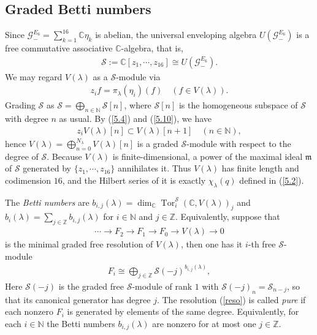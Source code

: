 \documentclass[12pt]{article}
\numberwithin{equation}{section}
\theoremstyle{definition}
\theoremstyle{remark}
\begin{document}
\subsection{Graded Betti numbers}
Since $\mathscr{G}^{E_6}_-=\sum_{k=1}^{16}\mathbb{C}\eta_k$ is abelian, the universal enveloping algebra $U(\mathscr{G}^{E_6}_-)$ is a free commutative associative $\mathbb{C}$-algebra, that is,
\begin{eqnarray}
	\mathscr{S}:=\mathbb{C}[z_1,\cdots,z_{16}]\cong U(\mathscr{G}^{E_6}_-).
\end{eqnarray}
We may regard $V(\lambda)$ as a $\mathscr{S}$-module via
\begin{eqnarray}
	z_if=\pi_{\lambda}(\eta_i)(f)\quad (f\in V(\lambda)).
\end{eqnarray}
Grading $\mathscr{S}$ as $\mathscr{S}=\bigoplus_{n\in\mathbb{N}}\mathscr{S}[n]$, where $\mathscr{S}[n]$ is the homogeneous subspace of $\mathscr{S}$ with degree $n$ as usual.
By (\ref{5.4}) and (\ref{5.10}), we have
\begin{eqnarray}
	z_iV(\lambda)[n]\subset V(\lambda)[n+1]\quad(n\in\mathbb{N}),
\end{eqnarray}
hence $V(\lambda)=\bigoplus_{{n}=0}^{N_{\lambda}}V(\lambda)[n]$ is a graded $\mathscr{S}$-module with respect to the degree of $\mathscr{S}$. Because $V(\lambda)$ is finite-dimensional, a power of the maximal ideal $\mathfrak{m}$ of $\mathscr{S}$ generated by $\{z_1,\cdots,z_{16}\}$ annihilates it. Thus $V(\lambda)$ has finite length and codimension $16$, and the Hilbert series of it is exactly $\chi_\lambda(q)$ defined in (\ref{5.2}). 

The {\it Betti numbers} are $b_{i,j}(\lambda)=\dim_{\mathbb{C}}\operatorname{Tor}_i^{\mathscr{S}}(\mathbb{C},V(\lambda))_j$ and $b_i(\lambda)=\sum_{j\in\mathbb{Z}}b_{i,j}(\lambda)$ for $i\in\mathbb{N}$ and $j\in\mathbb{Z}$. Equivalently, suppose that
\begin{eqnarray}
	\cdots\longrightarrow F_2\longrightarrow F_1\longrightarrow F_0\longrightarrow V(\lambda)\longrightarrow 0 \label{reso}
\end{eqnarray}
is the minimal graded free resolution of $V(\lambda)$, then one has it $i$-th free $\mathscr{S}$-module
\begin{eqnarray}
	F_i\cong \bigoplus_{j\in\mathbb{Z}}\mathscr{S}(-j)^{b_{i,j}(\lambda)}, \label{ith}
\end{eqnarray}
Here $\mathscr{S}(-j)$ is the graded free $\mathscr{S}$-module of rank $1$ with $\mathscr{S}(-j)_n=\mathscr{S}_{n-j}$, so that its canonical generator has degree $j$.
The resolution (\ref{reso}) is called {\it pure} if each nonzero $F_i$ is generated by elements of the same degree. Equivalently, for each $i\in\mathbb{N}$ the Betti numbers $b_{i,j}(\lambda)$ are nonzero for at most one $j\in\mathbb{Z}$.
\end{document}
